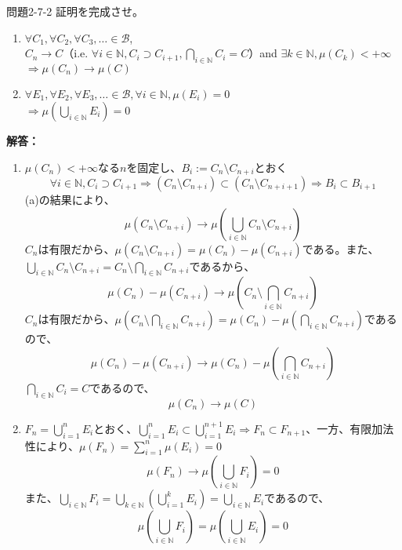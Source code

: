 \documentclass{jsarticle}
\begin{document}
\begin{itembox}[l]{問題2-7-2}
証明を完成させ。
\begin{enumerate}
\item $\forall C_1,\forall C_2,\forall C_3,\dots \in \mathcal{B}$,\\
$C_n \rightarrow C$（i.e. $\forall i \in \mathbb{N}, C_i \supset C_{i+1}, \bigcap_{i \in \mathbb{N}}C_i = C$）and $\exists k \in \mathbb{N},\mu(C_k) < + \infty$ \\
$\Rightarrow \mu(C_n) \rightarrow \mu(C)$
\item $\forall E_1,\forall E_2,\forall E_3,\dots \in \mathcal{B}, \forall i \in \mathbb{N}, \mu(E_i) = 0 $\\
$\Rightarrow \mu(\bigcup_{i \in \mathbb{N}} E_i)=0$
\end{enumerate}

\end{itembox}
{\bf 解答：}
\begin{enumerate}
\item $\mu(C_n) < + \infty$なる$n$を固定し、$B_i := C_n \setminus C_{n+i}$とおく\\
\[
\forall i \in \mathbb{N},C_i \supset C_{i+1}  \Rightarrow (C_n \setminus C_{n+i}) \subset (C_n \setminus C_{n+i+1}) \Rightarrow B_i \subset B_{i+1}
\]
(a)の結果により、
\[
\mu(C_n \setminus C_{n+i}) \rightarrow \mu(\bigcup_{i \in \mathbb{N}}C_n \setminus C_{n+i})
\]
$C_n$は有限だから、$\mu(C_n \setminus C_{n+i}) = \mu(C_n) - \mu(C_{n+i})$である。また、$\bigcup_{i \in \mathbb{N}}C_n \setminus C_{n+i} = C_n \setminus \bigcap_{i \in \mathbb{N}}C_{n+i} $であるから、
\[
 \mu(C_n) - \mu(C_{n+i}) \rightarrow \mu(C_n \setminus \bigcap_{i \in \mathbb{N}}C_{n+i} )
\]
$C_n$は有限だから、$ \mu(C_n \setminus \bigcap_{i \in \mathbb{N}}C_{n+i}) =  \mu(C_n) - \mu( \bigcap_{i \in \mathbb{N}}C_{n+i} )$であるので、
\[
 \mu(C_n) - \mu(C_{n+i}) \rightarrow \mu(C_n) - \mu( \bigcap_{i \in \mathbb{N}}C_{n+i} )
\]
$\bigcap_{i \in \mathbb{N}}C_{i} = C$であるので、
\[
\mu(C_{n}) \rightarrow \mu(C)
\]
\item $F_{n} = \bigcup_{i=1}^{n} E_i$とおく、$\bigcup_{i=1}^{n} E_i \subset \bigcup_{i=1}^{n+1} E_i \Rightarrow F_n \subset F_{n+1}$、一方、有限加法性により、$\mu(F_n)=\sum_{i=1}^n \mu(E_i) =0$
\[
\mu(F_n) \rightarrow \mu(\bigcup_{i \in \mathbb{N}}F_i) = 0
\]
また、$\bigcup_{i \in \mathbb{N}}F_i = \bigcup_{k \in \mathbb{N}}(\bigcup_{i=1}^k E_i) = \bigcup_{i \in \mathbb{N}} E_i$であるので、
\[
 \mu(\bigcup_{i \in \mathbb{N}}F_i) =  \mu(\bigcup_{i \in \mathbb{N}} E_i) = 0
\]

\end{enumerate}
\end{document}
